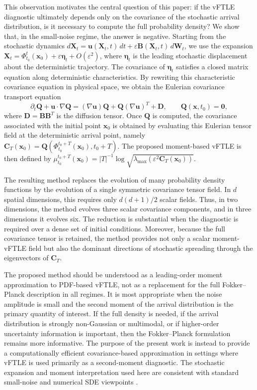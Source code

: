 \documentclass[a4paper,11pt]{article}
\numberwithin{equation}{section}
\theoremstyle{plain}
\theoremstyle{definition}
\theoremstyle{remark}
\newcommand{\bx}{\mathbf{x}}
\newcommand{\bu}{\mathbf{u}}
\newcommand{\bX}{\mathbf{X}}
\newcommand{\bW}{\mathbf{W}}
\newcommand{\bB}{\mathbf{B}}
\newcommand{\bC}{\mathbf{C}}
\newcommand{\bD}{\mathbf{D}}
\newcommand{\bQ}{\mathbf{Q}}
\newcommand{\bzero}{\mathbf{0}}
\newcommand{\etaVec}{\boldsymbol{\eta}}
\begin{document}
This observation motivates the central question of this paper: if the vFTLE diagnostic ultimately depends only on the covariance of the stochastic arrival distribution, is it necessary to compute the full probability density?  We show that, in the small-noise regime, the answer is negative.  Starting from the stochastic dynamics \(d\bX_t=\bu(\bX_t,t)\,dt+\varepsilon\bB(\bX_t,t)\,d\bW_t\), we use the expansion \(\bX_t=\Phi_{t_0}^{t}(\bx_0)+\varepsilon\etaVec_t+O(\varepsilon^2)\), where \(\etaVec_t\) is the leading stochastic displacement about the deterministic trajectory.  The covariance of \(\etaVec_t\) satisfies a closed matrix equation along deterministic characteristics.  By rewriting this characteristic covariance equation in physical space, we obtain the Eulerian covariance transport equation
\begin{equation}
    \partial_t \bQ+\bu\cdot\nabla\bQ
    =
    (\nabla\bu)\bQ+\bQ(\nabla\bu)^T+\bD,
    \qquad
    \bQ(\bx,t_0)=\bzero,
    \label{eq:eulerian_Q_intro}
\end{equation}
where \(\bD=\bB\bB^T\) is the diffusion tensor.  Once \(\bQ\) is computed, the covariance associated with the initial point \(\bx_0\) is obtained by evaluating this Eulerian tensor field at the deterministic arrival point, namely \(\bC_T(\bx_0)=\bQ(\Phi_{t_0}^{t_0+T}(\bx_0),t_0+T)\).  The proposed moment-based vFTLE is then defined by \(\mu_{t_0}^{t_0+T}(\bx_0)=|T|^{-1}\log\sqrt{\lambda_{\max}(\varepsilon^2\bC_T(\bx_0))}\).

The resulting method replaces the evolution of many probability density functions by the evolution of a single symmetric covariance tensor field.  In \(d\) spatial dimensions, this requires only \(d(d+1)/2\) scalar fields.  Thus, in two dimensions, the method evolves three scalar covariance components, and in three dimensions it evolves six.  The reduction is substantial when the diagnostic is required over a dense set of initial conditions.  Moreover, because the full covariance tensor is retained, the method provides not only a scalar moment-vFTLE field but also the dominant directions of stochastic spreading through the eigenvectors of \(\bC_T\).

The proposed method should be understood as a leading-order moment approximation to PDF-based vFTLE, not as a replacement for the full Fokker--Planck description in all regimes.  It is most appropriate when the noise amplitude is small and the second moment of the arrival distribution is the primary quantity of interest.  If the full density is needed, if the arrival distribution is strongly non-Gaussian or multimodal, or if higher-order uncertainty information is important, then the Fokker--Planck formulation remains more informative.  The purpose of the present work is instead to provide a computationally efficient covariance-based approximation in settings where vFTLE is used primarily as a second-moment diagnostic.  The stochastic expansion and moment interpretation used here are consistent with standard small-noise and numerical SDE viewpoints \cite{Kloeden92,Higham01}.
\end{document}
